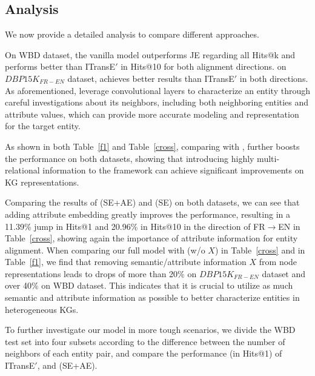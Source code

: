 \subsection{Analysis\label{sec:analysis}}



We now provide a detailed analysis to compare different approaches.

On WBD dataset, the vanilla \GCN model outperforms JE regarding all Hits@k and performs better than ITransE$'$ in Hits@10 for both alignment directions. on $DBP15K_{FR-EN}$ dataset, \GCN achieves better results than ITransE$'$ in both directions. As aforementioned, \GCNs leverage convolutional layers to characterize an entity through careful investigations about its neighbors, including both neighboring entities and attribute values, which can provide more accurate modeling and representation for the target entity.

 As shown in both Table~\ref{f1} and Table~\ref{cross}, comparing with \GCN, \RGCN further boosts the performance on both datasets, showing that introducing highly multi-relational information to the \GCN framework can achieve significant improvements on KG representations.


Comparing the results of \HRGCN (SE+AE) and \HRGCN (SE) on both datasets, we can see that adding attribute embedding greatly improves the performance, resulting in a 11.39\% jump in Hits@1 and 20.96\% in Hits@10 in the direction of FR$\rightarrow$EN in Table~\ref{cross}, showing again the importance of attribute information for entity alignment.
When comparing our full model \HRGCN with \HRGCN (w/o $X$) in Table~\ref{cross} and in Table~\ref{f1}, we find that removing semantic/attribute information $X$ from node representations leads to drops of more than 20\% on $DBP15K_{FR-EN}$ dataset and over 40\% on WBD dataset. This indicates that it is crucial to utilize
as much semantic and attribute information as possible to better characterize entities in heterogeneous KGs.

To further investigate our model in more tough scenarios, %
we divide the WBD test set into four subsets according to the difference between the number of neighbors of each entity pair, and compare the performance (in Hits@1) of ITransE$'$, \GCN and \HRGCN (SE+AE). %

